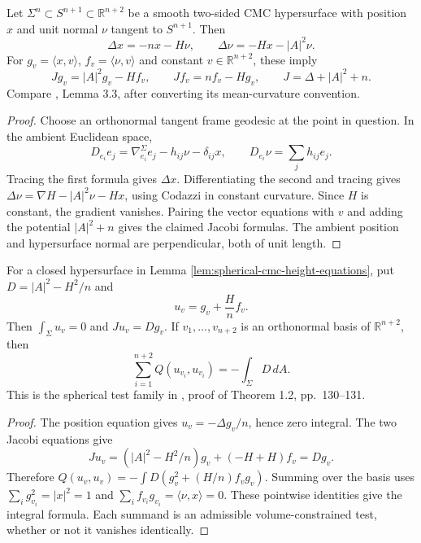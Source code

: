 \begin{lemma}\label{lem:spherical-cmc-height-equations}
Let $\Sigma^n\subset S^{n+1}\subset\mathbb R^{n+2}$ be a smooth two-sided CMC hypersurface with position $x$ and unit normal $\nu$ tangent to $S^{n+1}$. Then
\[
 \Delta x=-nx-H\nu,\qquad \Delta\nu=-H x-|A|^2\nu.
\]
For $g_v=\langle x,v\rangle$, $f_v=\langle\nu,v\rangle$ and constant $v\in\mathbb R^{n+2}$, these imply
\[
 Jg_v=|A|^2g_v-Hf_v,\qquad Jf_v=nf_v-Hg_v,
 \qquad J=\Delta+|A|^2+n.
\]
Compare \cite{BdCE88}, Lemma 3.3, after converting its mean-curvature convention.
\end{lemma}
\begin{proof}
Choose an orthonormal tangent frame geodesic at the point in question. In the ambient Euclidean space,
\[
 D_{e_i}e_j=\nabla^\Sigma_{e_i}e_j-h_{ij}\nu-\delta_{ij}x,
 \qquad D_{e_i}\nu=\sum_jh_{ij}e_j.
\]
Tracing the first formula gives $\Delta x$. Differentiating the second and tracing gives
$\Delta\nu=\nabla H-|A|^2\nu-Hx$, using Codazzi in constant curvature. Since $H$ is constant, the gradient vanishes. Pairing the vector equations with $v$ and adding the potential $|A|^2+n$ gives the claimed Jacobi formulas. The ambient position and hypersurface normal are perpendicular, both of unit length.
\end{proof}

\begin{proposition}\label{prop:spherical-cmc-defect-test}
For a closed hypersurface in Lemma \ref{lem:spherical-cmc-height-equations}, put $D=|A|^2-H^2/n$ and
\[
 u_v=g_v+\frac Hn f_v.
\]
Then $\int_\Sigma u_v=0$ and $Ju_v=Dg_v$. If $v_1,\ldots,v_{n+2}$ is an orthonormal basis of $\mathbb R^{n+2}$, then
\[
 \sum_{i=1}^{n+2}Q(u_{v_i},u_{v_i})=-\int_\Sigma D\,dA.
\]
This is the spherical test family in \cite{BdCE88}, proof of Theorem 1.2, pp.~130--131.
\end{proposition}
\begin{proof}
The position equation gives $u_v=-\Delta g_v/n$, hence zero integral. The two Jacobi equations give
\[
 Ju_v=(|A|^2-H^2/n)g_v+(-H+H)f_v=Dg_v.
\]
Therefore $Q(u_v,u_v)=-\int D(g_v^2+(H/n)f_vg_v)$. Summing over the basis uses $\sum_i g_{v_i}^2=|x|^2=1$ and $\sum_i f_{v_i}g_{v_i}=\langle\nu,x\rangle=0$. These pointwise identities give the integral formula. Each summand is an admissible volume-constrained test, whether or not it vanishes identically.
\end{proof}

